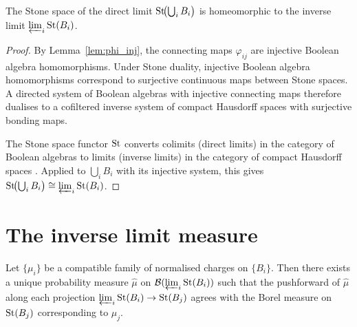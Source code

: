 \begin{proposition}[Step A]
\label{prop:stepA}
The Stone space of the direct limit $\mathrm{St}\!\bigl(\bigcup_i B_i\bigr)$ is homeomorphic
to the inverse limit $\varprojlim_i \mathrm{St}(B_i)$.
\end{proposition}

\begin{proof}
By Lemma~\ref{lem:phi_inj}, the connecting maps $\varphi_{ij}$ are injective Boolean
algebra homomorphisms.  Under Stone duality, injective Boolean algebra homomorphisms
correspond to surjective continuous maps between Stone spaces.  A directed system of
Boolean algebras with injective connecting maps therefore dualises to a cofiltered
inverse system of compact Hausdorff spaces with surjective bonding maps.

The Stone space functor $\mathrm{St}$ converts colimits (direct limits) in the category of
Boolean algebras to limits (inverse limits) in the category of compact Hausdorff
spaces \cite[II.4]{johnstone1982}.  Applied to $\bigcup_i B_i$ with its injective
system, this gives $\mathrm{St}\!\bigl(\bigcup_i B_i\bigr) \cong \varprojlim_i \mathrm{St}(B_i)$.
\end{proof}

\section{The inverse limit measure}
\label{sec:invlim}

\begin{proposition}
\label{prop:invlim}
Let $\{\mu_i\}$ be a compatible family of normalised charges on $\{B_i\}$.  Then there
exists a unique probability measure $\hat{\mu}$ on $\mathcal{B}(\varprojlim_i \mathrm{St}(B_i))$ such
that the pushforward of $\hat{\mu}$ along each projection $\varprojlim_i \mathrm{St}(B_i) \to
\mathrm{St}(B_j)$ agrees with the Borel measure on $\mathrm{St}(B_j)$ corresponding to $\mu_j$.
\end{proposition}

